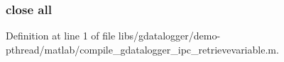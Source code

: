 \subsubsection[{all}]{\setlength{\rightskip}{0pt plus 5cm}close {\bf all}}\label{libs_2gdatalogger_2demo-pthread_2matlab_2compile__gdatalogger__ipc__retrievevariable_8m_a00a349297fa58bc80ff5329e25dcfe28}


Definition at line 1 of file libs/gdatalogger/demo-\/pthread/matlab/compile\_\-gdatalogger\_\-ipc\_\-retrievevariable.m.